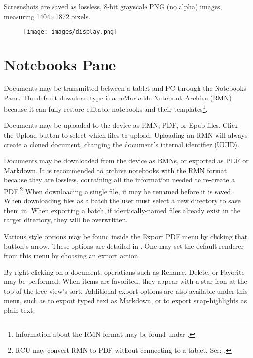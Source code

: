 Screenshots are saved as lossless, 8-bit grayscale PNG (no alpha) images, measuring 1404$\times$1872 pixels.

\vfill

\begin{figure}[h]
  \centering
  \texttt{[image: images/display.png]}
  \caption{}
  \label{fig:displaypane}
\end{figure}

\vfill

\newpage
\section{Notebooks Pane}
\label{sec:notebookspane}
Documents may be transmitted between a tablet and PC through the Notebooks Pane. The default download type is a reMarkable Notebook Archive (RMN) because it can fully restore editable notebooks and their templates\footnote{Information about the RMN format may be found under .}.

Documents may be uploaded to the device as RMN, PDF, or Epub files. Click the Upload button to select which files to upload. Uploading an RMN will always create a cloned document, changing the document's internal identifier (UUID).

Documents may be downloaded from the device as RMNs, or exported as PDF or Markdown. It is recommended to archive notebooks with the RMN format because they are lossless, containing all the information needed to re-create a PDF.\footnote{RCU may convert RMN to PDF without connecting to a tablet. See: .} When downloading a single file, it may be renamed before it is saved. When downloading files as a batch the user must select a new directory to save them in. When exporting a batch, if identically-named files already exist in the target directory, they will be overwritten.

Various style options may be found inside the Export PDF menu by clicking that button's arrow. These options are detailed in . One may set the default renderer from this menu by choosing an export action.

By right-clicking on a document, operations such as Rename, Delete, or Favorite may be performed. When items are favorited, they appear with a star icon at the top of the tree view's sort. Additional export options are also available under this menu, such as to export typed text as Markdown, or to export snap-highlights as plain-text.

